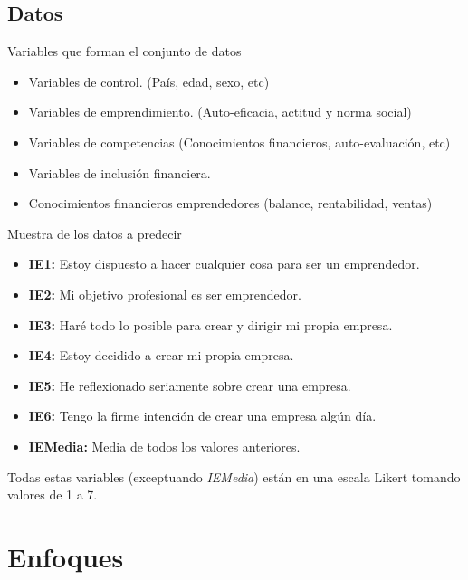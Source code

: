 \documentclass{beamer}
\begin{document}
	\subsection{Datos}
		\begin{frame}{Variables que forman el conjunto de datos}
			\begin{itemize}
				\item Variables de control. (País, edad, sexo, etc)
				\item Variables de emprendimiento. (Auto-eficacia, actitud y norma social)
				\item Variables de competencias (Conocimientos financieros, auto-evaluación, etc)
				\item Variables de inclusión financiera.
				\item Conocimientos financieros emprendedores (balance, rentabilidad, ventas)
			\end{itemize}
		\end{frame}
		\begin{frame}{Muestra de los datos a predecir}
			\begin{itemize}
				\item \textbf{IE1:} Estoy dispuesto a hacer cualquier cosa para ser un emprendedor.
				\item \textbf{IE2:} Mi objetivo profesional es ser emprendedor.
				\item \textbf{IE3:} Haré todo lo posible para crear y dirigir mi propia empresa.
				\item \textbf{IE4:} Estoy decidido a crear mi propia empresa. 
				\item \textbf{IE5:} He reflexionado seriamente sobre crear una empresa.
				\item \textbf{IE6:} Tengo la firme intención de crear una empresa algún día. 
				\item \textbf{IEMedia:} Media de todos los valores anteriores. 
			\end{itemize}
		Todas estas variables (exceptuando \textit{IEMedia}) están en una escala Likert tomando valores de 1 a 7.
		\end{frame}

\section{Enfoques}
\end{document}
